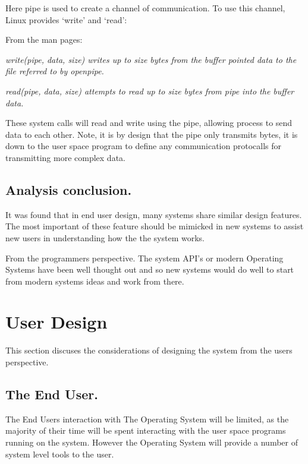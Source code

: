 \documentclass[a4paper]{report}
\begin{document}
Here pipe is used to create a channel of communication. To use this channel, Linux provides `write' and `read':

From the man pages:

\textit{write(pipe, data, size) writes up to size bytes from the buffer pointed data to the file referred to by openpipe.} \cite{manWrite}

\textit{read(pipe, data, size) attempts to read up to size bytes from pipe into the buffer data.} \cite{manRead}

These system calls will read and write using the pipe, allowing process to send data to each other. Note, it is by design that the pipe only transmits bytes, it is down to the user space program to define any communication protocalls for transmitting more complex data.

\subsection*{Analysis conclusion.}

It was found that in end user design, many systems share similar design features. The most important of these feature should be mimicked in new systems to assist new users in understanding how the the system works.

From the programmers perspective. The system API's or modern Operating Systems have been well thought out and so new systems would do well to start from modern systems ideas and work from there.


\clearpage
\section*{User Design}

This section discuses the considerations of designing the system from the users perspective.

\subsection*{The End User.}

The End Users interaction with The Operating System will be limited, as the majority of their time will be spent interacting with the user space programs running on the system. However the Operating System will provide a number of system level tools to the user.
\end{document}
